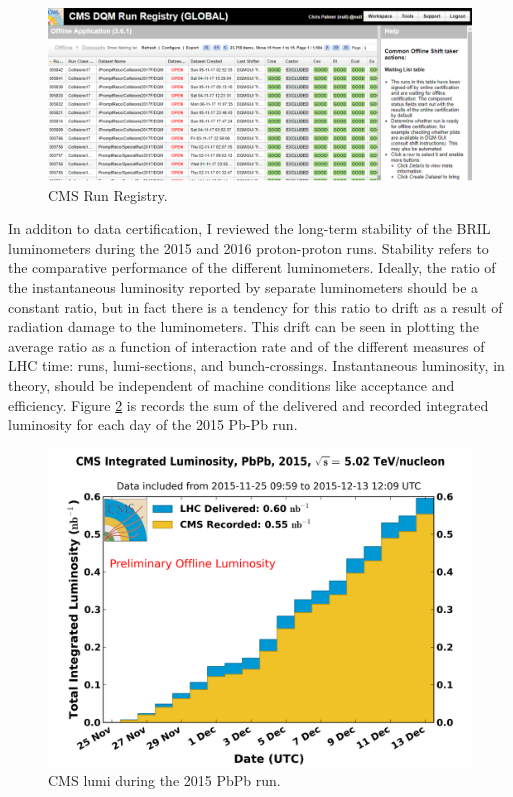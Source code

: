 \begin{figure}[h!]
\begin{centering}
\includegraphics[width=6in]{Chapter4/importfigs/chris_palmer_run_registry.png}
\par\end{centering}
\caption{CMS Run Registry. \label{fig:runRegistry}}
\end{figure}

In additon to data certification, I reviewed the long-term stability of the BRIL luminometers during the 2015 and 2016 proton-proton runs. Stability refers to the comparative performance of the different luminometers. Ideally, the ratio of the instantaneous luminosity reported by separate luminometers should be a constant ratio, but in fact there is a tendency for this ratio to drift as a result of radiation damage to the luminometers. This drift can be seen in plotting the average ratio as a function of interaction rate and of the different measures of LHC time: runs, lumi-sections, and bunch-crossings.  Instantaneous luminosity, in theory, should be independent of machine conditions like acceptance and efficiency. Figure \ref{fig:lumiHi2015} is records the sum of the delivered and recorded integrated luminosity for each day of the 2015 Pb-Pb run. 

\begin{figure}[h!]
\begin{centering}
\includegraphics[width=5in]{Chapter4/importfigs/int_lumi_per_day_cumulative_pbpb_2015_pbpb.png}
\par\end{centering}
\caption{CMS lumi during the 2015 PbPb run. \label{fig:lumiHi2015}}
\end{figure}

